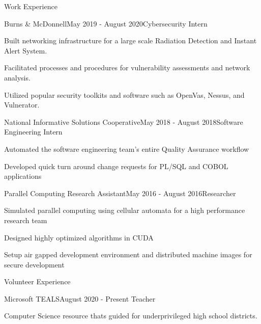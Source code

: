 \documentclass{resume}
\begin{document}
\begin{rSection}{Work Experience}
\begin{rSubsection}{Burns \& McDonnell}{May 2019 - August 2020}{Cybersecurity Intern}{}
    \item Built networking infrastructure for a large scale Radiation Detection and Instant Alert System. 
    \item Facilitated processes and procedures for vulnerability assessments and network analysis. 
    \item Utilized popular security toolkits and software such as OpenVas, Nessus, and Vulnerator. 
\end{rSubsection}
\begin{rSubsection}{National Informative Solutions Cooperative}{May 2018 - August 2018}{Software Engineering Intern}{}
    \item Automated the software engineering team's entire Quality Assurance workflow
    \item Developed quick turn around change requests for PL/SQL and COBOL applications
\end{rSubsection}
\begin{rSubsection}{Parallel Computing Research Assistant}{May 2016 - August 2016}{Researcher}{}
    \item Simulated parallel computing using cellular automata for a high performance research team
    \item Designed highly optimized algorithms in CUDA
    \item Setup air gapped development environment and distributed machine images for secure development
\end{rSubsection}
\end{rSection} 

\begin{rSection}{Volunteer Experience}
\begin{rSubsection}{Microsoft TEALS}{August 2020 - Present} {Teacher} {} 
    \item Computer Science resource thats guided for underprivileged high school districts.
\end{rSubsection}

\end{rSection}
\end{document}
